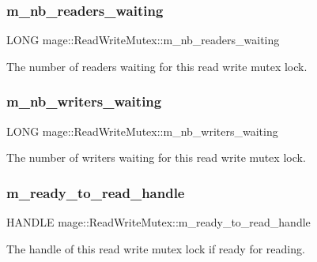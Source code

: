 \subsubsection{\texorpdfstring{m\+\_\+nb\+\_\+readers\+\_\+waiting}{m\_nb\_readers\_waiting}}
{\footnotesize\ttfamily L\+O\+NG mage\+::\+Read\+Write\+Mutex\+::m\+\_\+nb\+\_\+readers\+\_\+waiting\hspace{0.3cm}{\ttfamily [private]}}

The number of readers waiting for this read write mutex lock. \hypertarget{classmage_1_1_read_write_mutex_a003313794a9b43f80bd9b258b039438d}{}\label{classmage_1_1_read_write_mutex_a003313794a9b43f80bd9b258b039438d} 
\subsubsection{\texorpdfstring{m\+\_\+nb\+\_\+writers\+\_\+waiting}{m\_nb\_writers\_waiting}}
{\footnotesize\ttfamily L\+O\+NG mage\+::\+Read\+Write\+Mutex\+::m\+\_\+nb\+\_\+writers\+\_\+waiting\hspace{0.3cm}{\ttfamily [private]}}

The number of writers waiting for this read write mutex lock. \hypertarget{classmage_1_1_read_write_mutex_a65c0ef8b687d48104b09a9d175e72236}{}\label{classmage_1_1_read_write_mutex_a65c0ef8b687d48104b09a9d175e72236} 
\subsubsection{\texorpdfstring{m\+\_\+ready\+\_\+to\+\_\+read\+\_\+handle}{m\_ready\_to\_read\_handle}}
{\footnotesize\ttfamily H\+A\+N\+D\+LE mage\+::\+Read\+Write\+Mutex\+::m\+\_\+ready\+\_\+to\+\_\+read\+\_\+handle\hspace{0.3cm}{\ttfamily [private]}}

The handle of this read write mutex lock if ready for reading. \hypertarget{classmage_1_1_read_write_mutex_a9498ef85b52486342ba657f34369f89e}{}\label{classmage_1_1_read_write_mutex_a9498ef85b52486342ba657f34369f89e} 
